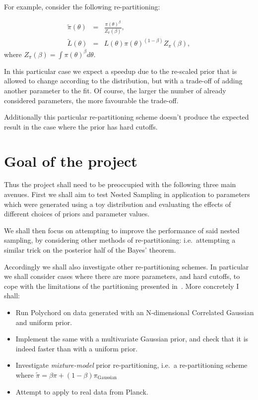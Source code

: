 \documentclass[12pt]{article}
\begin{document}
For example\autocite{chen-ferroz-hobson}, consider the following re-partitioning:

\begin{eqnarray} 
\tilde{\pi} (\theta) &=& \frac{\pi {(\theta)}^\beta }{Z_\pi (\beta)},\\
\tilde{L} (\theta) &=&L(\theta) \pi {(\theta)}^{(1-\beta)} Z_\pi(\beta) ,
\end{eqnarray}
where $Z_{\pi}(\beta) = \int \pi {(\theta)}^{\beta} d\theta$. 

In this particular case we expect a speedup due to the re-scaled prior
that is allowed to change according to the distribution, but with a
trade-off of adding another parameter to the fit. Of course, the
larger the number of already considered parameters, the more
favourable the trade-off.

Additionally this particular re-partitioning scheme doesn't produce
the expected result in the case where the prior has hard cutoffs.
\goodbreak%
\section{Goal of the project}\label{sec-5}

Thus the project shall need to be preoccupied with the following three
main avenues. First we shall aim to test Nested Sampling in
application to parameters which were generated using a toy
distribution and evaluating the effects of different choices of priors
and parameter values.

We shall then focus on attempting to improve the performance of said
nested sampling, by considering other methods of re-partitioning:
i.e.~attempting a similar trick on the posterior half of the Bayes'
theorem.

Accordingly we shall also investigate other re-partitioning
schemes. In particular we shall consider cases where there are more
parameters, and hard cutoffs, to cope with the limitations of the
partitioning presented in~\autocite{chen-ferroz-hobson}.
\goodbreak%
More concretely I shall: 
\begin{itemize}
\item Run Polychord on data generated with an N-dimensional Correlated
  Gaussian and uniform prior.
\item Implement the same with a multivariate Gaussian prior, and check
  that it is indeed faster than with a uniform prior.
\item Investigate \emph{mixture-model} prior re-partitioning, i.e.~a
  re-partitioning scheme where
  \( \tilde{\pi} = \beta \pi + (1 - \beta ) \pi_\text{Gaussian}\)
  
\item Attempt to apply to real data from Planck\autocite{planck}.
\end{itemize}
\end{document}
